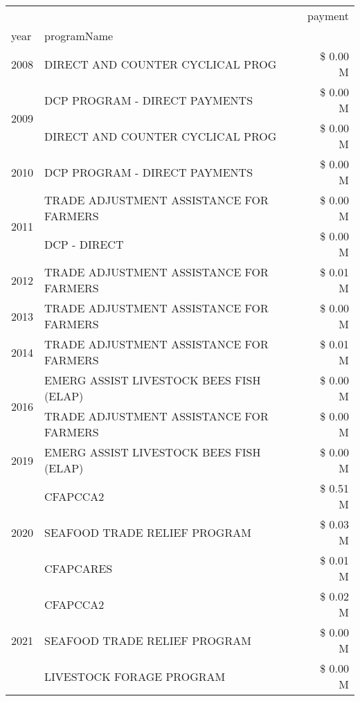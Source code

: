 \begin{tabular}{llr}
\toprule
 &  & payment \\
year & programName &  \\
\midrule
2008 & DIRECT AND COUNTER CYCLICAL PROG & \$ 0.00 M \\
\cline{1-3}
\multirow[t]{2}{*}{2009} & DCP PROGRAM - DIRECT PAYMENTS & \$ 0.00 M \\
 & DIRECT AND COUNTER CYCLICAL PROG & \$ 0.00 M \\
\cline{1-3}
2010 & DCP PROGRAM - DIRECT PAYMENTS & \$ 0.00 M \\
\cline{1-3}
\multirow[t]{2}{*}{2011} & TRADE ADJUSTMENT ASSISTANCE FOR FARMERS & \$ 0.00 M \\
 & DCP - DIRECT & \$ 0.00 M \\
\cline{1-3}
2012 & TRADE ADJUSTMENT ASSISTANCE FOR FARMERS & \$ 0.01 M \\
\cline{1-3}
2013 & TRADE ADJUSTMENT ASSISTANCE FOR FARMERS & \$ 0.00 M \\
\cline{1-3}
2014 & TRADE ADJUSTMENT ASSISTANCE FOR FARMERS & \$ 0.01 M \\
\cline{1-3}
\multirow[t]{2}{*}{2016} & EMERG ASSIST LIVESTOCK BEES FISH (ELAP) & \$ 0.00 M \\
 & TRADE ADJUSTMENT ASSISTANCE FOR FARMERS & \$ 0.00 M \\
\cline{1-3}
2019 & EMERG ASSIST LIVESTOCK BEES FISH (ELAP) & \$ 0.00 M \\
\cline{1-3}
\multirow[t]{3}{*}{2020} & CFAPCCA2 & \$ 0.51 M \\
 & SEAFOOD TRADE RELIEF PROGRAM & \$ 0.03 M \\
 & CFAPCARES & \$ 0.01 M \\
\cline{1-3}
\multirow[t]{3}{*}{2021} & CFAPCCA2 & \$ 0.02 M \\
 & SEAFOOD TRADE RELIEF PROGRAM & \$ 0.00 M \\
 & LIVESTOCK FORAGE PROGRAM & \$ 0.00 M \\
\cline{1-3}
\bottomrule
\end{tabular}
